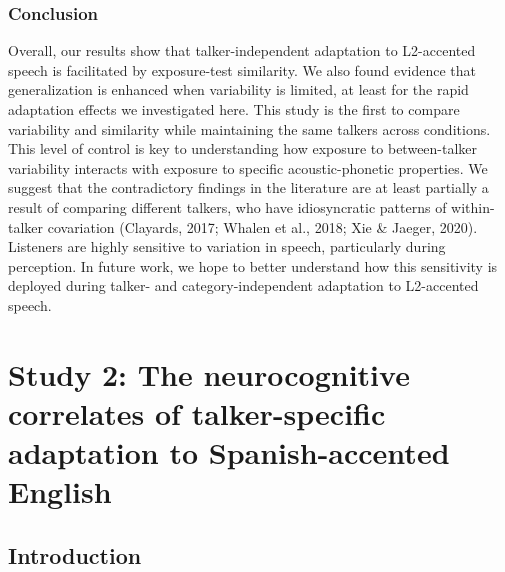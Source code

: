 \documentclass[
  12pt,
  twoside]{article}
\begin{document}
\hypertarget{conclusion}{%
\subsubsection{Conclusion}\label{conclusion}}

Overall, our results show that talker-independent adaptation to L2-accented speech is facilitated by exposure-test similarity.
We also found evidence that generalization is enhanced when variability is limited, at least for the rapid adaptation effects we investigated here.
This study is the first to compare variability and similarity while maintaining the same talkers across conditions.
This level of control is key to understanding how exposure to between-talker variability interacts with exposure to specific acoustic-phonetic properties.
We suggest that the contradictory findings in the literature are at least partially a result of comparing different talkers, who have idiosyncratic patterns of within-talker covariation (Clayards, 2017; Whalen et al., 2018; Xie \& Jaeger, 2020).
Listeners are highly sensitive to variation in speech, particularly during perception.
In future work, we hope to better understand how this sensitivity is deployed during talker- and category-independent adaptation to L2-accented speech.

\newpage

\hypertarget{study-2-the-neurocognitive-correlates-of-talker-specific-adaptation-to-spanish-accented-english}{%
\section{Study 2: The neurocognitive correlates of talker-specific adaptation to Spanish-accented English}\label{study-2-the-neurocognitive-correlates-of-talker-specific-adaptation-to-spanish-accented-english}}

\hypertarget{introduction-1}{%
\subsection{Introduction}\label{introduction-1}}
\end{document}
